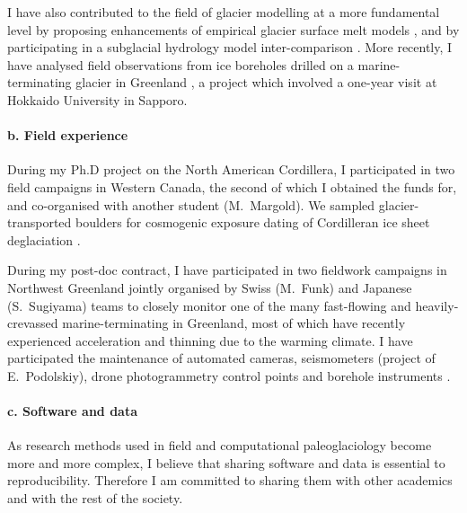 \documentclass{article}
\begin{document}
    I have also contributed to the field of glacier modelling at a more
    fundamental level by proposing enhancements of empirical glacier surface
    melt models \citep{Seguinot.2013, Seguinot.Rogozhina.2014}, and by
    participating in a subglacial hydrology model inter-comparison
    \citep{Fleurian.etal.2018}. More recently, I have analysed field
    observations from ice boreholes drilled on a marine-terminating glacier
    in Greenland \citep{Seguinot.etal.Inreview}, a project which involved a
    one-year visit at Hokkaido University in Sapporo.

\paragraph{b. Field experience}

    During my Ph.D project on the North American Cordillera, I participated in
    two field campaigns in Western Canada, the second of which I obtained the
    funds for, and co-organised with another student (M.~Margold). We
    sampled glacier-transported boulders for cosmogenic exposure dating of
    Cordilleran ice sheet deglaciation \citep{Menounos.etal.2017}.

    During my post-doc contract, I have participated in two fieldwork campaigns
    in Northwest Greenland jointly organised by Swiss (M.~Funk) and Japanese
    (S.~Sugiyama) teams to closely monitor one of the many fast-flowing and
    heavily-crevassed marine-terminating in Greenland, most of which have
    recently experienced acceleration and thinning due to the warming climate.
    I have participated the maintenance of automated cameras, seismometers
    (project of E.~Podolskiy), drone photogrammetry control points
    \citep{Jouvet.etal.2017, Jouvet.etal.2018} and borehole instruments
    \citep{Seguinot.etal.Inreview}.

\paragraph{c. Software and data}

    As research methods used in field and computational paleoglaciology become
    more and more complex, I believe that sharing software and data is
    essential to reproducibility. Therefore I am committed to sharing them with
    other academics and with the rest of the society.
\end{document}
